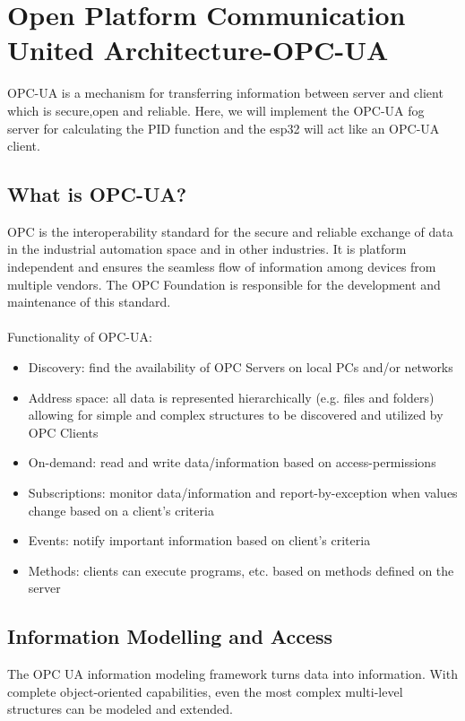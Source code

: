 \documentclass{article}
\begin{document}
  \pagebreak
  \section{Open Platform Communication United Architecture-OPC-UA}
  OPC-UA is a mechanism for transferring information between server and client which is secure,open and reliable. 
	Here, we will implement the OPC-UA fog server for calculating the PID function and the esp32 will act like an OPC-UA client. \\
	
	\subsection{What is OPC-UA?}
	OPC is the interoperability standard for the secure and reliable exchange of data in the industrial automation space and in other industries. It is platform independent and ensures the seamless flow of information among devices from multiple vendors. The OPC Foundation is responsible for the development and maintenance of this standard.\\
	\\
	
	Functionality of OPC-UA:
	\begin{itemize}
	\item Discovery: find the availability of OPC Servers on local PCs and/or networks
\item Address space: all data is represented hierarchically (e.g. files and folders) allowing for simple and complex structures to be discovered and utilized by OPC Clients
\item On-demand: read and write data/information based on access-permissions
\item Subscriptions: monitor data/information and report-by-exception when values change based on a client’s criteria
\item Events: notify important information based on client’s criteria
\item Methods: clients can execute programs, etc. based on methods defined on the server	
	\end{itemize}
	
	\subsection{Information Modelling and Access}
	The OPC UA information modeling framework turns data into information. With complete object-oriented capabilities, even the most complex multi-level structures can be modeled and extended.
\end{document}
